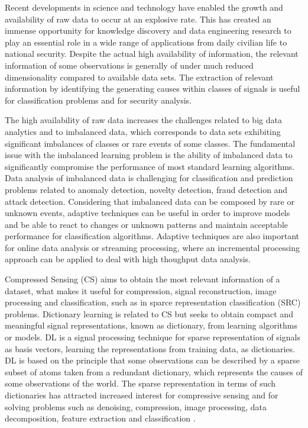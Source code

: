 Recent developments in science and technology have enabled the growth and availability of raw data to occur at an explosive rate. This has created an immense opportunity for knowledge discovery and data engineering research to play an essential role in a wide range of applications from daily civilian life to national security. Despite the actual high availability of information, the relevant information of some observations is generally of under much reduced dimensionality compared to available data sets. The extraction of relevant information by identifying the generating causes within classes of signals is useful for classification problems and for security analysis. 

The high availability of raw data increases the challenges related to big data analytics and to imbalanced data, which corresponds to data sets exhibiting significant imbalances of classes or rare events of some classes. The fundamental issue with the imbalanced learning problem is the ability of imbalanced data to significantly compromise the performance of most standard learning algorithms. Data analysis of imbalanced data is challenging for classification and prediction problems related to anomaly detection, novelty detection, fraud detection and attack detection. Considering that imbalanced data can be composed by rare or unknown events, adaptive techniques can be useful in order to improve models and be able to react to changes or unknown patterns and maintain acceptable performance for classification algorithms. Adaptive techniques are also important for online data analysis or streaming processing, where an incremental processing approach can be applied to deal with high thoughput data analysis.

Compressed Sensing (CS) aims to obtain the most relevant information of a dataset, what makes it useful for compression, signal reconstruction, image processing and classification, such as in sparce representation classification (SRC) problems. Dictionary learning is related to CS but seeks to obtain compact and meaningful signal representations, known as dictionary, from learning algorithms or models. DL is a signal processing technique for sparse representation of signals as basis vectors, learning the representations from training data, as dictionaries. DL is based on the principle that some observations can be described by a sparse subset of atoms taken from a redundant dictionary, which represents the causes of some observations of the world. The sparse representation in terms of such dictionaries has attracted increased interest for compressive sensing and for solving problems such as denoising, compression, image processing, data decomposition, feature extraction and classification \cite{tosic2011dictionary, zhang2010discriminative, zhu2016coupled,ravishankar2011mr}. 

